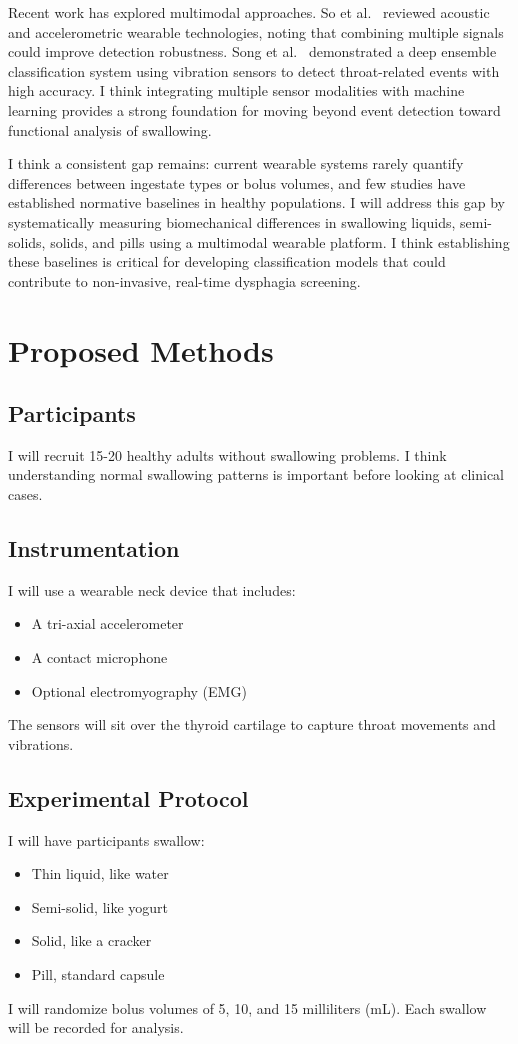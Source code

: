 \documentclass[conference]{IEEEtran}
\begin{document}
Recent work has explored multimodal approaches. So et al.~\cite{6} reviewed acoustic and accelerometric wearable technologies, noting that combining multiple signals could improve detection robustness. Song et al.~\cite{7} demonstrated a deep ensemble classification system using vibration sensors to detect throat-related events with high accuracy. I think integrating multiple sensor modalities with machine learning provides a strong foundation for moving beyond event detection toward functional analysis of swallowing.

I think a consistent gap remains: current wearable systems rarely quantify differences between ingestate types or bolus volumes, and few studies have established normative baselines in healthy populations. I will address this gap by systematically measuring biomechanical differences in swallowing liquids, semi-solids, solids, and pills using a multimodal wearable platform. I think establishing these baselines is critical for developing classification models that could contribute to non-invasive, real-time dysphagia screening.

\section{Proposed Methods}

\subsection{Participants}
I will recruit 15-20 healthy adults without swallowing problems. I think understanding normal swallowing patterns is important before looking at clinical cases.

\subsection{Instrumentation}
I will use a wearable neck device that includes:
\begin{itemize}
    \item A tri-axial accelerometer
    \item A contact microphone
    \item Optional electromyography (EMG)
\end{itemize}
The sensors will sit over the thyroid cartilage to capture throat movements and vibrations.

\subsection{Experimental Protocol}
I will have participants swallow:
\begin{itemize}
    \item Thin liquid, like water
    \item Semi-solid, like yogurt
    \item Solid, like a cracker
    \item Pill, standard capsule
\end{itemize}
I will randomize bolus volumes of 5, 10, and 15 milliliters (mL). Each swallow will be recorded for analysis.
\end{document}
